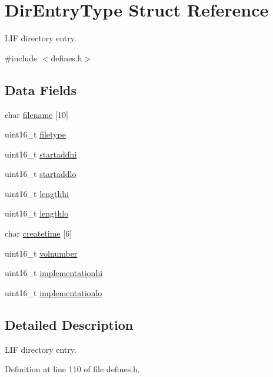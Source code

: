 \hypertarget{structDirEntryType}{}\section{Dir\+Entry\+Type Struct Reference}
\label{structDirEntryType}


L\+IF directory entry.  




{\ttfamily \#include $<$defines.\+h$>$}

\subsection*{Data Fields}
\begin{DoxyCompactItemize}
\item 
char \hyperlink{structDirEntryType_aa60fae0a6b7ba9c966cbcf46e555f396}{filename} \mbox{[}10\mbox{]}
\item 
uint16\+\_\+t \hyperlink{structDirEntryType_ada14562440087858ebf04bc4c81eedd2}{filetype}
\item 
uint16\+\_\+t \hyperlink{structDirEntryType_a0cab2915e9f864e25b24d298c36c11db}{startaddhi}
\item 
uint16\+\_\+t \hyperlink{structDirEntryType_aea0e798bb172b4bddf174ce339a4a54a}{startaddlo}
\item 
uint16\+\_\+t \hyperlink{structDirEntryType_ad7aaba7b01038bc8bacb096bd66fff08}{lengthhi}
\item 
uint16\+\_\+t \hyperlink{structDirEntryType_ad1cde25a0229866557cd5983c27fbd31}{lengthlo}
\item 
char \hyperlink{structDirEntryType_a627fd55537c73d4fee596b140e106c01}{createtime} \mbox{[}6\mbox{]}
\item 
uint16\+\_\+t \hyperlink{structDirEntryType_add9ab11f89586efb100471f6580e75c5}{volnumber}
\item 
uint16\+\_\+t \hyperlink{structDirEntryType_a27a15eea3264d44c9e93e3be77093151}{implementationhi}
\item 
uint16\+\_\+t \hyperlink{structDirEntryType_a8164d577c06fb7c312aaa4955d491449}{implementationlo}
\end{DoxyCompactItemize}


\subsection{Detailed Description}
L\+IF directory entry. 

Definition at line 110 of file defines.\+h.



